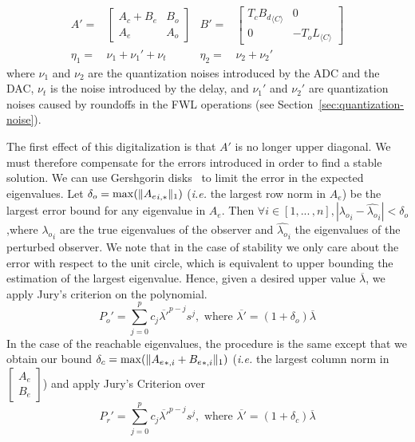 \documentclass[sigconf]{llncs}
\DeclarePairedDelimiter\norm{\lVert}{\rVert}
\newcommand{\mat}[1]{{#1}}
\begin{document}
{\setlength{\abovedisplayskip}{0pt}
\begin{align*}
\mat{A}'=&\left [\begin{array}{cc}\mat{A}_{c}+\mat{B}_{e}&\mat{B}_{o}\\ \mat{A}_{e}&\mat{A}_{o}\end{array}\right]&
\mat{B}'=&\left[\begin{array}{cc}\mat{T}_c{\mat{B}_d}_{\langle C \rangle}&\mat{0}\\\mat{0}&-\mat{T}_o\mat{L}_{\langle C \rangle}\end{array}\right]\\
\eta_1=&\nu_1+\nu_1'+\nu_t& \eta_2=&\nu_2+\nu_2'
\end{align*}
}
where $\nu_1$ and $\nu_2$ are the quantization noises introduced by the ADC and the DAC, $\nu_t$ is the noise introduced by the delay, and $\nu_1'$ and $\nu_2'$ are quantization noises caused by roundoffs in the FWL operations (see Section~\ref{sec:quantization-noise}).

The first effect of this digitalization is that $\mat{A}'$ is no longer upper
diagonal.  We must therefore compensate for the errors introduced in order
to find a stable solution.  We can use Gershgorin disks~\cite{van1996matrix} to limit the error
in the expected eigenvalues.  Let $\delta_o=\max(\norm{{\mat{A}_e}_{i,*}}_1)$
(\emph{i.e.} the largest row norm in $\mat{A}_e$) be the largest error bound
for any eigenvalue in $\mat{A}_e$.  Then $\forall i \in [1, ...\,,n],
|{\lambda_o}_{i}-\hat{\lambda_o}_{i}|<\delta_o$,where ${\lambda_o}_{i}$ are the
true eigenvalues of the observer and $\hat{\lambda_o}_{i}$ the eigenvalues of
the perturbed observer.  We note that in the case of stability we only care
about the error with respect to the unit circle, which is equivalent to
upper bounding the estimation of the largest eigenvalue.  Hence, given a
desired upper value $\overline{\lambda}$, we apply Jury's criterion on the
polynomial.
%
\begin{equation}
P_o'=\sum_{j=0}^p c_j\overline{\lambda'}^{p-j}s^j, \text{ where }  \overline{\lambda'}=(1+\delta_o)\overline{\lambda}
\end{equation}
%
In the case of the reachable eigenvalues, the procedure is the same except
that we obtain our bound $\delta_c=\max(\norm{{\mat{A}_e}_{*,i}+{\mat{B}_e}_{*,i}}_1)$
(\emph{i.e.} the largest column norm in $ \left[\begin{array}{c}\mat{A}_e\\ \mat{B}_e\end{array}\right]$) and
apply Jury's Criterion over
%
\begin{equation}
P_r'=\sum_{j=0}^p c_j\overline{\lambda'}^{p-j}s^j, \text{ where }  \overline{\lambda'}=(1+\delta_c)\overline{\lambda}
\end{equation}
\end{document}
